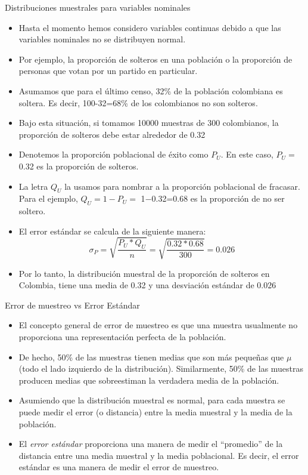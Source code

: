 \documentclass{beamer}
\begin{document}
\begin{frame}{Distribuciones muestrales para variables nominales}
\begin{itemize}
\justifying
\item Hasta el momento hemos considero variables continuas debido a que las variables nominales no se distribuyen normal.
\item Por ejemplo, la proporción de solteros en una población o la proporción de personas que votan por un partido en particular.
\item Asumamos que para el último censo, 32\% de la población colombiana es soltera. Es decir, 100-32=68\% de los colombianos no son solteros.
\item Bajo esta situación, si tomamos 10000 muestras de 300 colombianos, la proporción de solteros debe estar alrededor de 0.32
\end{itemize}
\end{frame}

\begin{frame}
\begin{itemize}
\justifying 
\item Denotemos la proporción poblacional de éxito como $P_U$. En este caso, $P_U=$ 0.32 es la proporción de solteros.
\item La letra $Q_U$ la usamos para nombrar a la proporción poblacional de fracasar. Para el ejemplo, $Q_U=1-P_U=$ 1$-$0.32=0.68 es la proporción de no ser soltero.
\item El error estándar se calcula de la siguiente manera:
$$\sigma_P=\sqrt{\dfrac{P_U*Q_U}{n}}=\sqrt{\dfrac{0.32*0.68}{300}}=0.026$$
\item Por lo tanto, la distribución muestral de la proporción de solteros en Colombia, tiene una media de 0.32 y una desviación estándar de 0.026
\end{itemize}
\end{frame}

\begin{frame}{Error de muestreo vs Error Estándar}
	\begin{itemize}
		\justifying
		\item El concepto general de error de muestreo es que una muestra usualmente no proporciona una representación perfecta de la población.
		\item De hecho, 50\% de las muestras tienen medias que son más pequeñas que $\mu$ (todo el lado izquierdo de la distribución). Similarmente,
		50\% de las muestras producen medias que sobreestiman la verdadera media de la población.
		\item Asumiendo que la distribución muestral es normal, para cada muestra se puede medir el error (o distancia) entre la media muestral y la media de la población.
		\item El \emph{error estándar} proporciona una manera de medir el ``promedio''  de la distancia entre una media muestral y la media poblacional. Es decir, el error estándar es una manera de medir el error de muestreo.
	\end{itemize}
\end{frame}
\end{document}
